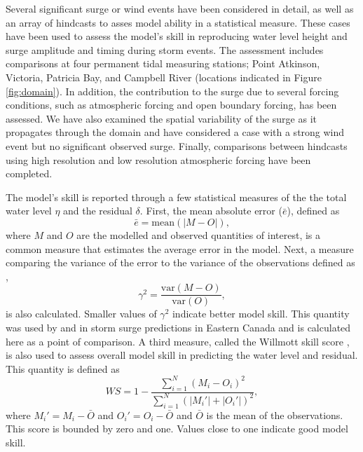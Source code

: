 \documentclass[pdftex,10pt]{article}
\begin{document}
Several significant surge or wind events have been considered in detail, as well as an array of hindcasts to asses model ability in a statistical measure. These cases have been used to assess the model's skill in reproducing water level height and surge amplitude and timing during storm events. The assessment includes comparisons at four permanent tidal measuring stations; Point Atkinson, Victoria, Patricia Bay, and Campbell River (locations indicated in Figure \ref{fig:domain}).  In addition, the contribution to the surge due to several forcing conditions, such as atmospheric forcing and open boundary forcing, has been assessed. We have also examined the spatial variability of the surge as it propagates through the domain and have considered a case with a strong wind event but no significant observed surge.  Finally, comparisons between hindcasts using high resolution and low resolution atmospheric forcing have been completed.

The model's skill is reported through a few statistical measures of the the total water level $\eta$ and the residual $\delta$. First, the mean absolute error ($\bar{e}$), defined as
\begin{equation}
\bar{e} = \text{mean}\left(\left| M - O \right|\right),
\end{equation}
where $M$ and $O$ are the modelled and observed quantities of interest, is a common measure that estimates the average error in the model. Next, a measure comparing the variance of the error to the variance of the observations defined as \citep{thompson2003prediction},
\begin{equation}
\gamma^2 = \frac{\text{var}\left(M-O\right)}{\text{var}\left(O\right)},
\end{equation}
is also calculated. Smaller values of $\gamma^2$ indicate better model skill. This quantity was used by \citet{bernier2006predicting} and \citet{bernier2010tide} in storm surge predictions in Eastern Canada and is calculated here as a point of comparison. A third measure, called the Willmott skill score \citep{willmott1982some}, is also used to assess overall model skill in predicting the water level and residual. This quantity is defined as
\begin{equation}
WS = 1 - \frac{\sum_{i=1}^N \left(M_i - O_i\right)^2}{\sum_{i=1}^N \left(|M_i'| + |O_i'|\right)^2},
\end{equation} 
where $M_i' = M_i-\bar{O}$ and $O_i'=O_i-\bar{O}$ and $\bar{O}$ is the mean of the observations. This score is bounded by zero and one. Values close to one indicate good model skill. 
\end{document}
